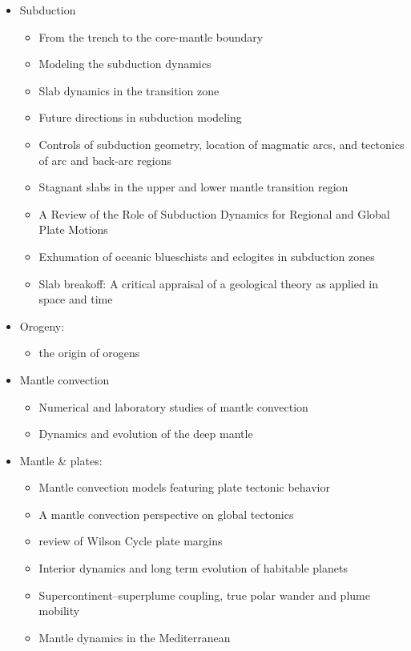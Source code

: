\begin{itemize}

\item Subduction
   \begin{itemize}
   \item From the trench to the core-mantle boundary \cite{kinc95}
   \item Modeling the subduction dynamics \cite{bill08}
   \item Slab dynamics in the transition zone \cite{bill10}
   \item Future directions in subduction modeling \cite{gery11}
   \item Controls of subduction geometry, location of magmatic arcs, 
         and tectonics of arc and back-arc regions \cite{crpi82}
   \item Stagnant slabs in the upper and lower mantle transition region \cite{fuwo01}
   \item A Review of the Role of Subduction Dynamics for Regional and Global Plate Motions \cite{befa09}
   \item Exhumation of oceanic blueschists and eclogites in subduction zones \cite{agyj09}
   \item Slab breakoff: A critical appraisal of a geological theory as applied in space and time \cite{garm18}
   \end{itemize}

\item Orogeny:
   \begin{itemize}
   \item the origin of orogens \cite{jabe13} 
   \end{itemize}

\item Mantle convection 

   \begin{itemize}
   \item Numerical and laboratory studies of mantle convection \cite{taxn05}
   \item Dynamics and evolution of the deep mantle  \cite{tack12}
   \end{itemize}

\item Mantle \& plates:
   \begin{itemize}
   \item Mantle convection models featuring plate tectonic behavior \cite{lowm11}
   \item A mantle convection perspective on global tectonics \cite{cogu17}
   \item review of Wilson Cycle plate margins \cite{buto14}
   \item Interior dynamics and long term evolution of habitable planets \cite{taab12}
   \item Supercontinent–superplume coupling, true polar wander and plume mobility \cite{lizh09}
   \item Mantle dynamics in the Mediterranean \cite{faba14}
   \end{itemize}


\end{itemize}
